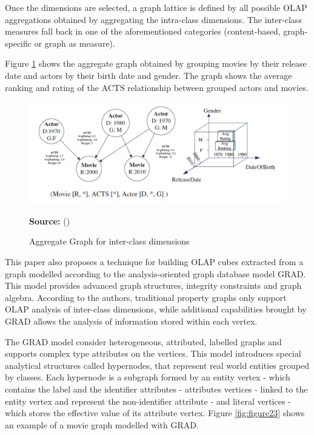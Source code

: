 Once the dimensions are selected, a graph lattice is defined by all possible OLAP aggregations obtained by aggregating the intra-class dimensions. The inter-class measures fall back in one of the aforementioned categories (content-based,  graph-specific or graph as measure).

Figure \ref{fig:figure22} shows the aggregate graph obtained by grouping movies by their release date and actors by their birth date and gender. The graph shows the average ranking and rating of the ACTS relationship between grouped actors and movies.

\begin{figure}[ht]
\centering
\caption{Aggregate Graph for inter-class dimensions}
\label{fig:figure22}
\includegraphics[width=1\textwidth]{images/interclass_dimension.png}
\par\medskip\ABNTEXfontereduzida\selectfont\textbf{Source:} \citeauthor{ghrab2015framework} (\citeyear{ghrab2015framework}) \par\medskip
\end{figure}

This paper also proposes a technique for building OLAP cubes extracted from a graph modelled according to the analysis-oriented graph database model GRAD. This model provides advanced graph structures, integrity constraints and graph algebra. According to the authors, traditional property graphs only support OLAP analysis of inter-class dimensions, while additional capabilities brought by GRAD allows the analysis of information stored within each vertex.

The GRAD model consider heterogeneous, attributed, labelled graphs and supports complex type attributes on the vertices. This model introduces special analytical structures called hypernodes, that represent real world entities grouped by classes. Each hypernode is a subgraph formed by an entity vertex - which contains the label and the identifier attributes - attributes vertices - linked to the entity vertex and represent the non-identifier attribute - and literal vertices - which stores the effective value of its attribute vertex. Figure \ref{fig:figure23} shows an example of a movie graph modelled with GRAD.

